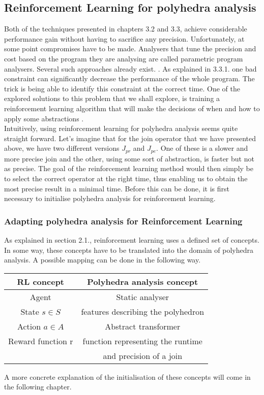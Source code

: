 \subsection{Reinforcement Learning for polyhedra analysis}
Both of the techniques presented in chapters 3.2 and 3.3, achieve considerable performance gain without having to sacrifice any precision. Unfortunately, at some point compromises have to be made. Analysers that tune the precision and cost based on the program they are analysing are called parametric program analysers. Several such approaches already exist. \cite{oh2015learning,liang2011learning,heo2016learning}.
As explained in 3.3.1. one bad constraint can significantly decrease the performance of the whole program. The trick is being able to identify this constraint at the correct time. One of the explored solutions to this problem that we shall explore, is training a reinforcement learning algorithm  that will make the decisions of when and how to apply some abstractions \cite{singh2018fast}.\\
Intuitively, using reinforcement learning for polyhedra analysis seems quite straight forward. Let's imagine that for the join operator that we have presented above, we have two different versions $J_{pr}$ and $J_{pe}$. One of these is a slower and more precise join and the other, using some sort of abstraction, is faster but not as precise. The goal of the reinforcement learning method would then simply be to select the correct operator at the right time, thus enabling us to obtain the most precise result in a minimal time. Before this can be done, it is first necessary to initialise polyhedra analysis for reinforcement learning.

\subsubsection{Adapting polyhedra analysis for Reinforcement Learning}
As explained in section 2.1., reinforcement learning uses a defined set of concepts. In some way, these concepts have to be translated into the domain of polyhedra analysis. A possible mapping can be done in the following way.
\begin{center}
\begin{tabular}{||c c||} 
 \hline
 RL concept & Polyhedra analysis concept  \\ [0.5ex] 
 \hline
 \hline
 Agent & Static analyser\\ 

 State $s\in S$ & features describing the polyhedron\\

 Action $a \in A$ & Abstract transformer \\
 
 Reward function r & function representing the runtime\\
 
  & and precision of a join\\
 \hline
\end{tabular}
\end{center}
A more concrete explanation of the initialisation of these concepts will come in the following chapter.

